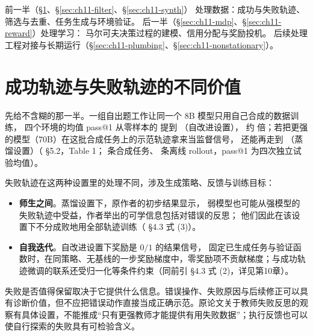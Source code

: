 前一半（\S\ref{sec:ch11-data}、\S\ref{sec:ch11-filter}、\S\ref{sec:ch11-synth}）
处理数据：成功与失败轨迹、筛选与去重、任务生成与环境验证。
后一半（\S\ref{sec:ch11-mdp}、\S\ref{sec:ch11-reward}）处理学习：
马尔可夫决策过程的建模、信用分配与奖励投机。
后续处理工程对接与长期运行（\S\ref{sec:ch11-plumbing}、\S\ref{sec:ch11-nonstationary}）。

\section{成功轨迹与失败轨迹的不同价值}
\label{sec:ch11-data}

\begin{sloppypar}
先给不含糊的那一半。一组自出题工作让同一个 8B 模型只用自己合成的数据训练，
四个环境的均值 pass@1 从零样本的  提到 （自改进设置），
约  倍；若把更强的模型（70B）在这批合成任务上的示范轨迹拿来当监督信号，
还能再走到 （蒸馏设置）（\cite{self-challenging-2506} §5.2，Table 1；
 条合成任务、 条离线 rollout，pass@1 为四次独立试验均值）。
\end{sloppypar}

\begin{sloppypar}
失败轨迹在这两种设置里的处理不同，涉及生成策略、反馈与训练目标：
\end{sloppypar}

\begin{itemize}
\sloppy
  \item \textbf{师生之间}。蒸馏设置下，原作者的初步结果显示，
        弱模型也可能从强模型的失败轨迹中受益，作者举出的可学信息包括对错误的反思；
        他们因此在该设置下不分成败地用全部轨迹训练（\cite{self-challenging-2506} §4.3 式 (3)）。
  \item \textbf{自我迭代}。自改进设置下奖励是 $0/1$ 的结果信号，
        固定已生成任务与验证函数时，在同策略、无基线的一步奖励梯度中，零奖励项不贡献梯度；与成功轨迹微调的联系还受归一化等条件约束（同前引 §4.3 式 (2)，详见第10章）。
\end{itemize}

\begin{sloppypar}
失败是否值得保留取决于它提供什么信息。错误操作、失败原因与后续修正可以具有诊断价值，但不应把错误动作直接当成正确示范。原论文关于教师失败反思的观察有具体设置，不能推成“只有更强教师才能提供有用失败数据”；执行反馈也可以使自行探索的失败具有可检验含义。
\end{sloppypar}


